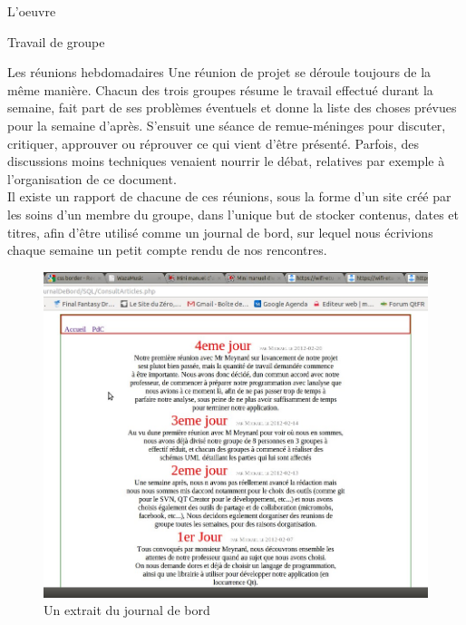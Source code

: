 \documentclass[a4paper, 12pt]{report}
\begin{document}
\begin{part}{L'oeuvre}
\begin{chapter}{Travail de groupe}
\begin{section}{Les réunions hebdomadaires}
				Une réunion de projet se déroule toujours de la même manière. Chacun des trois groupes résume le travail effectué durant la semaine,
				fait part de ses problèmes éventuels et donne la liste des choses prévues pour la semaine d'après.
				S'ensuit une séance de remue-méninges pour discuter, critiquer, approuver ou réprouver ce qui vient d'être présenté.
				Parfois, des discussions moins techniques venaient nourrir le débat, relatives par exemple à l'organisation de ce document.\\

				Il existe un rapport de chacune de ces réunions, sous la forme d'un site créé par les soins d'un membre du groupe, 
				dans l'unique but de stocker contenus, dates et titres, afin d'être utilisé comme un journal de bord, sur lequel nous écrivions
				chaque semaine un petit compte rendu de nos rencontres.

				\begin{figure}[ht]
					\begin{center}
						\includegraphics[width=14cm]{images/journal.jpg}
						\caption{Un extrait du journal de bord}
						\label{jdb}
					\end{center}
				\end{figure}~\\


\end{section}
\end{chapter}
\end{part}
\end{document}

